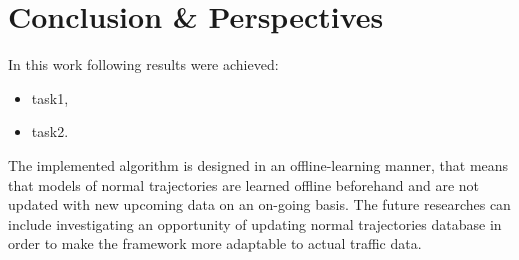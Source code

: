 \chapter{Conclusion \& Perspectives}
\label{ch:Conclusion & Perspectives}

In this work following results were achieved:
\begin{itemize}
	\item task1,
	\item task2.
\end{itemize}

\bigbreak
\bigbreak
The implemented algorithm is designed in an offline-learning manner, that means that models of normal trajectories are learned offline beforehand and are not updated with new upcoming data on an on-going basis. The future researches can include investigating an opportunity of updating normal trajectories database in order to make the framework more adaptable to actual traffic data.
